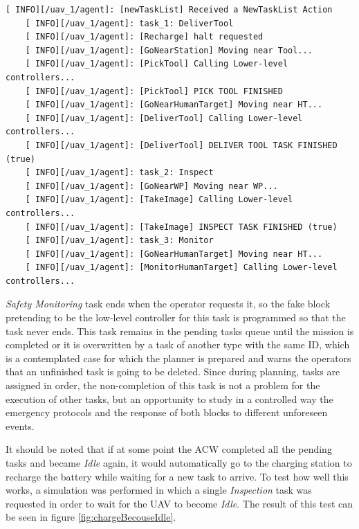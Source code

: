 \begin{lstlisting}[caption={Feedback messages printed by the \emph{Agent Behaviour Manager} during the execution of the whole plan}, breaklines=true, label=exit:firstPlanFeedback]
    [ INFO][/uav_1/agent]: [newTaskList] Received a NewTaskList Action
    [ INFO][/uav_1/agent]: task_1: DeliverTool
    [ INFO][/uav_1/agent]: [Recharge] halt requested
    [ INFO][/uav_1/agent]: [GoNearStation] Moving near Tool...
    [ INFO][/uav_1/agent]: [PickTool] Calling Lower-level controllers...
    [ INFO][/uav_1/agent]: [PickTool] PICK TOOL FINISHED
    [ INFO][/uav_1/agent]: [GoNearHumanTarget] Moving near HT...
    [ INFO][/uav_1/agent]: [DeliverTool] Calling Lower-level controllers...
    [ INFO][/uav_1/agent]: [DeliverTool] DELIVER TOOL TASK FINISHED (true)
    [ INFO][/uav_1/agent]: task_2: Inspect
    [ INFO][/uav_1/agent]: [GoNearWP] Moving near WP...
    [ INFO][/uav_1/agent]: [TakeImage] Calling Lower-level controllers...
    [ INFO][/uav_1/agent]: [TakeImage] INSPECT TASK FINISHED (true)
    [ INFO][/uav_1/agent]: task_3: Monitor
    [ INFO][/uav_1/agent]: [GoNearHumanTarget] Moving near HT...
    [ INFO][/uav_1/agent]: [MonitorHumanTarget] Calling Lower-level controllers...
\end{lstlisting}

\emph{Safety Monitoring} task ends when the operator requests it, so the fake block pretending to be the low-level controller for this task is programmed so that the task never ends. This task remains in the pending tasks queue until the mission is completed or it is overwritten by a task of another type with the same \gls{ID}, which is a contemplated case for which the planner is prepared and warns the operators that an unfinished task is going to be deleted. Since during planning, tasks are assigned in order, the non-completion of this task is not a problem for the execution of other tasks, but an opportunity to study in a controlled way the emergency protocols and the response of both blocks to different unforeseen events.

It should be noted that if at some point the \gls{ACW} completed all the pending tasks and became \emph{Idle} again, it would automatically go to the charging station to recharge the battery while waiting for a new task to arrive. To test how well this works, a simulation was performed in which a single \emph{Inspection} task was requested in order to wait for the \gls{UAV} to become \emph{Idle}. The result of this test can be seen in figure \ref{fig:chargeBecouseIdle}.

